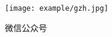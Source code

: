 
\begin{pre}
	\thispagestyle{empty}
	\begin{center}
		{}
	\end{center}

\vspace*{5\baselineskip}
\centerline{\texttt{[image: example/gzh.jpg]}}
\centerline{\fontsize{26pt}{26pt} 微信公众号}
\end{pre}